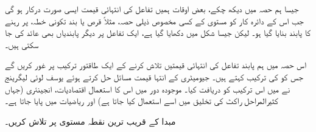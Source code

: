 جیسا ہم  حصہ  میں دیکھ چکے،  بعض اوقات ہمیں تفاعل کی انتہائی قیمت ایسی صورت  درکار ہو گی جب اس کے دائرہ کار کو مستوی کے کسی مخصوص  ذیلی  حصہ، مثلاً قرص یا  بند تکونی خطہ،  پر رہنے کا پابند بنایا    گیا ہو۔  لیکن جیسا شکل  میں دکھایا گیا ہے، ایک تفاعل پر  دیگر  پابندیاں بھی عائد کی جا سکتی ہیں۔

اس حصہ میں ہم پابند تفاعل کی انتہائی قیمتیں تلاش کرنے کے ایک طاقتور ترکیب پر غور کریں گے جس کو  کی ترکیب کہتے ہیں۔  جیومیٹری  کے  انتہا   قیمت مسائل حل کرتے ہوئے     یوسف  لوئی لیگرینج  نے  میں  اس ترکیب کو دریافت کیا۔  موجودہ دور میں اس کا استعمال اقتصادیات، انجینئری  (جہاں  کثیرالمراحل راکٹ کی تخلیق میں اسے استعمال کیا جاتا ہے) اور ریاضیات  میں پایا جاتا ہے۔

مبدا کے قریب ترین نقطہ مستوی   پر تلاش کریں۔

